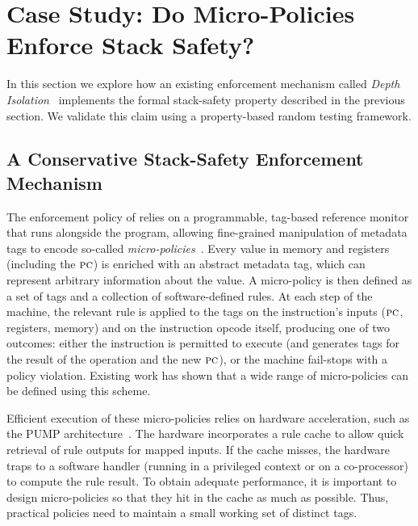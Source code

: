 \documentclass[acmsmall,review,anonymous]{acmart}\settopmatter{printfolios=true,printccs=false,printacmref=false}
\begin{document}
{\section{Case Study: Do Micro-Policies Enforce Stack Safety?}
\label{sec:enforcement}

In this section we explore how an existing enforcement mechanism called {\em
  Depth Isolation}~\citep{DBLP:conf/sp/RoesslerD18} implements
the formal stack-safety property described in the previous
section. We validate this claim
using a property-based random testing framework.

\subsection{A Conservative Stack-Safety Enforcement Mechanism}
%
The enforcement policy of \citeauthor{DBLP:conf/sp/RoesslerD18} relies
on a programmable, tag-based reference monitor that runs alongside the
program,
allowing fine-grained manipulation of metadata tags to encode so-called
\emph{micro-policies}~\citep{pump_oakland2015}.
Every value in
memory and registers (including the $\textsc{pc}$)
is enriched with an abstract metadata tag, which can represent
arbitrary information about the value. A micro-policy is then defined as a
set of tags and a
collection of software-defined rules.
At each step of the machine, the relevant rule is applied to the tags on
the instruction's inputs ($\textsc{pc}$, registers, memory) and on the
instruction opcode itself, producing
one of two outcomes: either the instruction is permitted to execute (and
generates tags for the result of the operation and the new $\textsc{pc}$), or
the machine fail-stops with a policy violation.
Existing work \citep{TestingNI:ICFP,pump_oakland2015, DBLP:conf/sp/RoesslerD18}
has shown that a wide range of
micro-policies can be defined using this scheme.

Efficient execution of these micro-policies relies on hardware acceleration,
such as the PUMP architecture~\citep{pump:asplos2015}.
The hardware incorporates a rule cache
to allow quick retrieval of rule outputs for mapped inputs. If the cache misses,
the hardware traps to a software handler (running in a privileged context or
on a co-processor) to compute the rule result. To obtain adequate performance,
it is important to design micro-policies so that they hit in the cache as
much as possible. Thus, practical policies need to maintain a small working
set of distinct tags.

}
\end{document}
